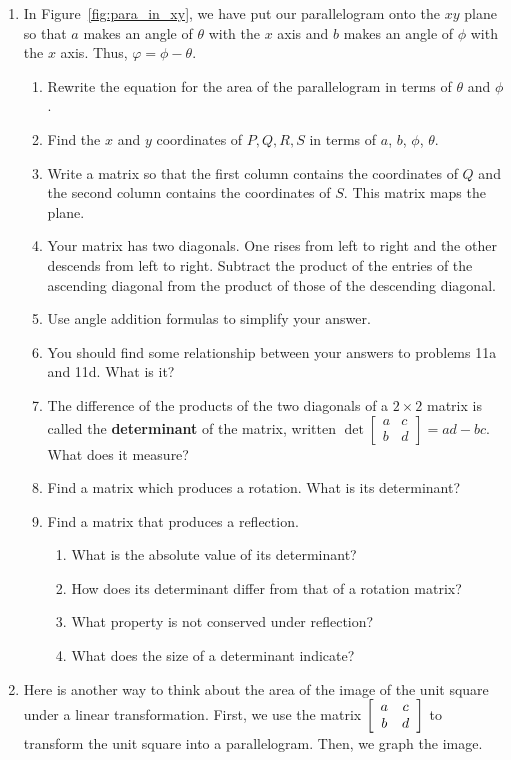 \documentclass[../gatm.tex]{subfiles}
\begin{document}
\begin{enumerate}
\setcounter{enumi}{\value{problem_i}}
\item In Figure~\ref{fig:para_in_xy}, we have put our parallelogram onto the $xy$ plane so that $a$ makes an angle of $\theta$ with the $x$ axis and $b$ makes an angle of $\phi$ with the $x$ axis. Thus, $\varphi=\phi-\theta$.
\begin{enumerate}
\item Rewrite the equation for the area of the parallelogram in terms of $\theta$ and $\phi$.
\item Find the $x$ and $y$ coordinates of $P,Q,R,S$ in terms of $a$, $b$, $\phi$, $\theta$.
\item Write a matrix so that the first column contains the coordinates of $Q$ and the second column contains the coordinates of $S$. This matrix maps the plane.
\item Your matrix has two diagonals. One rises from left to right and the other descends from left to right. Subtract the product of the entries of the ascending diagonal from the product of those of the descending diagonal.
\item Use angle addition formulas to simplify your answer.
\item You should find some relationship between your answers to problems 11a and 11d. What is it?
\item The difference of the products of the two diagonals of a $2\times 2$ matrix is called the \textbf{determinant} of the matrix, written $\det \left[\begin{smallmatrix}a & c \\ b & d \end{smallmatrix}\right]=ad-bc$. What does it measure?
\item Find a matrix which produces a rotation. What is its determinant?
\item Find a matrix that produces a reflection.
\begin{enumerate}
\item What is the absolute value of its determinant?
\item How does its determinant differ from that of a rotation matrix?
\item What property is not conserved under reflection?
\item What does the size of a determinant indicate?
\end{enumerate}
\end{enumerate}
\item Here is another way to think about the area of the image of the unit square under a linear transformation. First, we use the matrix $\left[\begin{array}{cc} a & c \\ b & d \end{array}\right]$ to transform the unit square into a parallelogram. Then, we graph the image. \label{prob:unit_square_into_parallelogram}

\end{enumerate}
\end{document}
